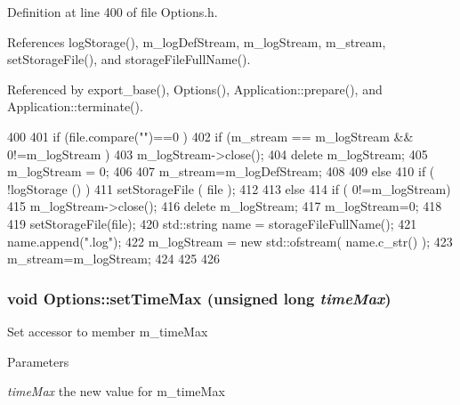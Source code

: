 Definition at line 400 of file Options.h.

References logStorage(), m\_\-logDefStream, m\_\-logStream, m\_\-stream, setStorageFile(), and storageFileFullName().

Referenced by export\_\-base(), Options(), Application::prepare(), and Application::terminate().


\begin{DoxyCode}
400                                                         {
401                 if (file.compare("")==0 ) {
402                         if (m_stream == m_logStream && 0!=m_logStream ) {
403                                 m_logStream->close();
404                                 delete m_logStream;
405                                 m_logStream = 0;
406                         }
407                         m_stream=m_logDefStream;
408                 }
409                 else {
410                         if ( !logStorage () ) {
411                                 setStorageFile ( file );
412                         }
413                         else {
414                                 if ( 0!=m_logStream) {
415                                         m_logStream->close();
416                                         delete m_logStream;
417                                         m_logStream=0;
418                                 }
419                                 setStorageFile(file);
420                                 std::string name = storageFileFullName();
421                                 name.append(".log");
422                                 m_logStream = new std::ofstream( name.c_str() );
423                                 m_stream=m_logStream;
424                         }
425                 }
426         }
\end{DoxyCode}
\hypertarget{classOptions_aaa921f68319ea83b5c5a13e37a831c7a}{
\subsubsection[{setTimeMax}]{\setlength{\rightskip}{0pt plus 5cm}void Options::setTimeMax (unsigned long {\em timeMax})}}
\label{classOptions_aaa921f68319ea83b5c5a13e37a831c7a}
Set accessor to member m\_\-timeMax 
\begin{DoxyParams}{Parameters}
\item[{\em timeMax}]the new value for m\_\-timeMax \end{DoxyParams}



